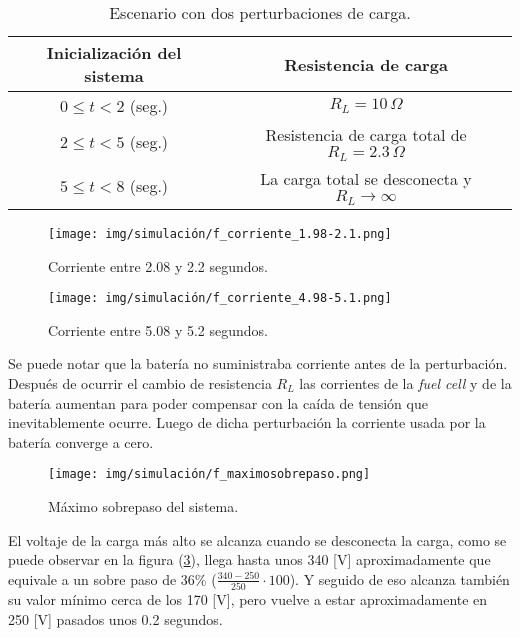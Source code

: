 \begin{table}[H]
    \centering
    \begin{tabular}{|c|c|}
    \hline
    \textbf{Inicialización del sistema} & \textbf{Resistencia de carga} \\
    \hline
    $0 \leq t < 2$ (seg.) & $R_L = 10\,\Omega$ \\
    \hline
    $2 \leq t < 5$ (seg.) & Resistencia de carga total de $R_L = 2.3\,\Omega$ \\
    \hline
    $5 \leq t < 8$ (seg.) & La carga total se desconecta y $R_L \rightarrow \infty$ \\
    \hline
\end{tabular}
\caption{Escenario con dos perturbaciones de carga.}
\label{tab:f}
\end{table}


\begin{figure}[H]
    \centering
    \texttt{[image: img/simulación/f\_corriente\_1.98-2.1.png]}
    \caption{Corriente entre 2.08 y 2.2 segundos.}
    \label{fig:f_corriente_1.98-2.1}
\end{figure}

\begin{figure}[H]
    \centering
    \texttt{[image: img/simulación/f\_corriente\_4.98-5.1.png]}
    \caption{Corriente entre 5.08 y 5.2 segundos.}
\label{fig:f_corriente_4.98-5.1}
\end{figure}

Se puede notar que la batería no suministraba corriente antes de la perturbación. 
Después de ocurrir el cambio de resistencia $R_L$ las corrientes de la \textit{fuel cell} y de
la batería aumentan para poder compensar con la caída de tensión que inevitablemente ocurre. 
Luego de dicha perturbación la corriente usada por la batería converge a cero. 

\begin{figure}[H]
    \centering
    \texttt{[image: img/simulación/f\_maximosobrepaso.png]}
    \caption{Máximo sobrepaso del sistema.}
\label{fig:f_maximosobrepaso}
\end{figure}

El voltaje de la carga más alto se alcanza cuando se desconecta la carga, como se puede observar 
en la figura (\ref{fig:f_maximosobrepaso}), llega hasta unos 340 [V] aproximadamente
que equivale a un sobre paso de 36\% ($\frac{340-250}{250} \cdot 100$). Y seguido de eso alcanza 
también su valor mínimo cerca de los 170 [V], pero vuelve a estar aproximadamente en 250 [V]
pasados unos 0.2 segundos.

